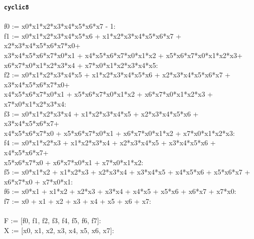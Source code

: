 \documentclass[letterpaper,12pt,titlepage,oneside,final]{book}
\newenvironment{codefont}{\footnotesize\ttfamily}{\par}
\begin{document}
\begin{appendices}
\noindent\textbf{\texttt{cyclic8}}\\\\
\noindent\begin{codefont}
 f0 := x0*x1*x2*x3*x4*x5*x6*x7 - 1:\\
f1 := x0*x1*x2*x3*x4*x5*x6 + x1*x2*x3*x4*x5*x6*x7 + x2*x3*x4*x5*x6*x7*x0+\\
x3*x4*x5*x6*x7*x0*x1 + x4*x5*x6*x7*x0*x1*x2 + x5*x6*x7*x0*x1*x2*x3+\\
x6*x7*x0*x1*x2*x3*x4 + x7*x0*x1*x2*x3*x4*x5:\\
f2 := x0*x1*x2*x3*x4*x5 + x1*x2*x3*x4*x5*x6 + x2*x3*x4*x5*x6*x7 + x3*x4*x5*x6*x7*x0+\\
x4*x5*x6*x7*x0*x1 + x5*x6*x7*x0*x1*x2 + x6*x7*x0*x1*x2*x3 + x7*x0*x1*x2*x3*x4:\\
f3 := x0*x1*x2*x3*x4 + x1*x2*x3*x4*x5 + x2*x3*x4*x5*x6 + x3*x4*x5*x6*x7+\\
x4*x5*x6*x7*x0 + x5*x6*x7*x0*x1 + x6*x7*x0*x1*x2 + x7*x0*x1*x2*x3:\\
f4 := x0*x1*x2*x3 + x1*x2*x3*x4 + x2*x3*x4*x5 + x3*x4*x5*x6 + x4*x5*x6*x7+\\
x5*x6*x7*x0 + x6*x7*x0*x1 + x7*x0*x1*x2:\\
f5 := x0*x1*x2 + x1*x2*x3 + x2*x3*x4 + x3*x4*x5 + x4*x5*x6 + x5*x6*x7 + \\x6*x7*x0 + x7*x0*x1:\\
f6 := x0*x1 + x1*x2 + x2*x3 + x3*x4 + x4*x5 + x5*x6 + x6*x7 + x7*x0:\\
f7 := x0 + x1 + x2 + x3 + x4 + x5 + x6 + x7:\\
\\
F := [f0, f1, f2, f3, f4, f5, f6, f7]:\\
X := [x0, x1, x2, x3, x4, x5, x6, x7]:\\
\end{codefont}


\end{appendices}
\end{document}

